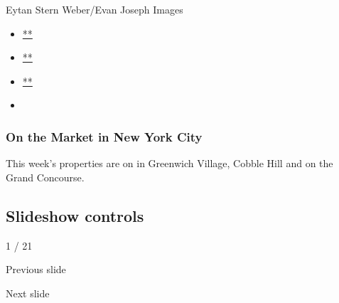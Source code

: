 Eytan Stern Weber/Evan Joseph Images

\begin{itemize}
\item
  \href{https://www.facebook.com/sharer.php?app_id=9869919170\&u=https\%3A\%2F\%2Fwww.nytimes.com\%2Fslideshow\%2F2020\%2F07\%2F30\%2Frealestate\%2Fon-the-market-in-new-york-city.html\%3Fsmid\%3Dfb-share\&name=On\%20the\%20Market\%20in\%20New\%20York\%20City\&redirect_uri=https\%3A\%2F\%2Fwww.facebook.com\%2F}{**}
\item
  \href{https://twitter.com/intent/tweet?url=https\%3A\%2F\%2Fwww.nytimes.com\%2Fslideshow\%2F2020\%2F07\%2F30\%2Frealestate\%2Fon-the-market-in-new-york-city.html\%3Fsmid\%3Dtw-share\&text=On\%20the\%20Market\%20in\%20New\%20York\%20City}{**}
\item
  \href{mailto:?subject=NYTimes.com\%3A\%20On\%20the\%20Market\%20in\%20New\%20York\%20City\&body=From\%20The\%20New\%20York\%20Times\%3A\%0A\%0AOn\%20the\%20Market\%20in\%20New\%20York\%20City\%0A\%0AThis\%20week\%E2\%80\%99s\%20properties\%20are\%20on\%20in\%20Greenwich\%20Village\%2C\%20Cobble\%20Hill\%20and\%20on\%20the\%20Grand\%20Concourse.\%0A\%0Ahttps\%3A\%2F\%2Fwww.nytimes.com\%2Fslideshow\%2F2020\%2F07\%2F30\%2Frealestate\%2Fon-the-market-in-new-york-city.html\%3Fsmid\%3Dem-share}{**}
\item
\end{itemize}

\hypertarget{on-the-market-in-new-york-city-1}{%
\subsubsection{On the Market in New York
City}\label{on-the-market-in-new-york-city-1}}

This week's properties are on in Greenwich Village, Cobble Hill and on
the Grand Concourse.

\hypertarget{slideshow-controls}{%
\subsection{Slideshow controls}\label{slideshow-controls}}

1 / 21

Previous slide

Next slide
